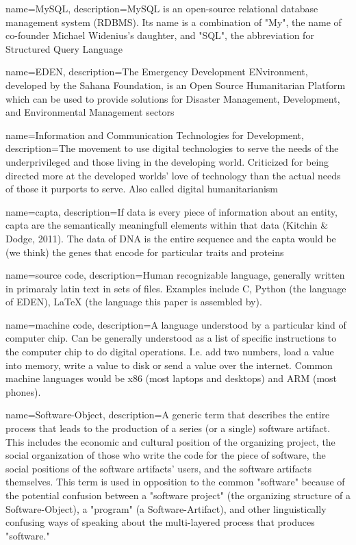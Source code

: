 {
   name=MySQL,
   description={MySQL is an open-source relational database management system (RDBMS). Its name is a combination of "My", the name of co-founder Michael Widenius's daughter, and "SQL", the abbreviation for Structured Query Language}
}

{
   name=EDEN,
   description={The Emergency Development ENvironment, developed by the Sahana Foundation, is an Open Source Humanitarian Platform which can be used to provide solutions for Disaster Management, Development, and Environmental Management sectors}
}

{
   name=Information and Communication Technologies for Development,
   description={The movement to use digital technologies to serve the needs of the underprivileged and those living in the developing world. Criticized for being directed more at the developed worlds' love of technology than the actual needs of those it purports to serve. Also called digital humanitarianism}
}

{
   name=capta,
   description={If data is every piece of information about an entity, capta are the semantically meaningfull elements within that data (Kitchin \& Dodge, 2011). The data of DNA is the entire sequence and the capta would be (we think) the genes that encode for particular traits and proteins}
}

{
   name=source code,
   description={Human recognizable language, generally written in primaraly latin text in sets of files. Examples include C, Python (the language of EDEN), LaTeX (the language this paper is assembled by).}
}

{
   name=machine code,
   description={A language understood by a particular kind of computer chip. Can be generally understood as a list of specific instructions to the computer chip to do digital operations. I.e. add two numbers, load a value into memory, write a value to disk or send a value over the internet. Common machine languages would be x86 (most laptops and desktops) and ARM (most phones).}
}

{
    name=Software-Object,
    description={A generic term that describes the entire process that leads to the production of a series (or a single) software artifact. This includes the economic and cultural position of the organizing project, the social organization of those who write the code for the piece of software, the social positions of the software artifacts' users, and the software artifacts themselves. This term is used in opposition to the common "software" because of the potential confusion between a "software project" (the organizing structure of a Software-Object), a "program" (a Software-Artifact), and other linguistically confusing ways of speaking about the multi-layered process that produces "software."}
}

